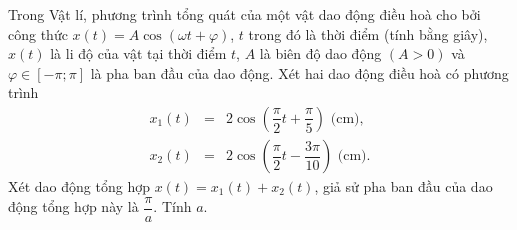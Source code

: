 \begin{bt}%

	Trong Vật lí, phương trình tổng quát của một vật dao động điều hoà cho bởi công thức $x(t)=A\cos(\omega t+\varphi)$, $t$ trong đó   là thời điểm (tính bằng giây), $x(t)$  là li độ của vật tại thời điểm $t$, $A$ là biên độ dao động $(A>0)$ và $\varphi \in \left[-\pi; \pi \right]$ là pha ban đầu của dao động. Xét hai dao động điều hoà có phương trình
	\allowdisplaybreaks
	\begin{eqnarray*}
		x_{1}(t)&=&2\cos \left(\dfrac{\pi}{2}t+\dfrac{\pi}{5} \right)\text{ (cm)},\\
		x_{2}(t)&=&2\cos \left(\dfrac{\pi}{2}t -\dfrac{3\pi}{10}\right)\text{ (cm)}.
	\end{eqnarray*}
	Xét dao động tổng hợp $x(t)=x_{1}(t) + x_{2}(t)$, giả sử pha ban đầu của dao động tổng hợp này là $\dfrac{\pi}{a}$. Tính $a$.

\end{bt}


